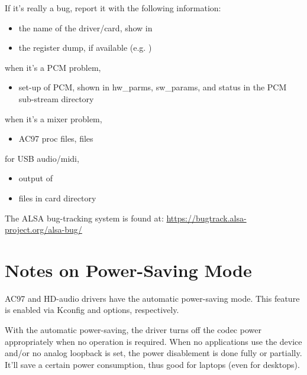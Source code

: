 \documentclass[a4paper,8pt,english]{sphinxmanual}
\begin{document}
If it's really a bug, report it with the following information:
\begin{itemize}
\item {} 
the name of the driver/card, show in 

\item {} 
the register dump, if available (e.g. )

\end{itemize}

when it's a PCM problem,
\begin{itemize}
\item {} 
set-up of PCM, shown in hw\_parms, sw\_params, and status in the PCM
sub-stream directory

\end{itemize}

when it's a mixer problem,
\begin{itemize}
\item {} 
AC97 proc files,  files

\end{itemize}

for USB audio/midi,
\begin{itemize}
\item {} 
output of 

\item {} 
 files in card directory

\end{itemize}

The ALSA bug-tracking system is found at:
\href{https://bugtrack.alsa-project.org/alsa-bug/}{https://bugtrack.alsa-project.org/alsa-bug/}


\section{Notes on Power-Saving Mode}
\label{sound/designs/powersave:notes-on-power-saving-mode}\label{sound/designs/powersave::doc}
AC97 and HD-audio drivers have the automatic power-saving mode.
This feature is enabled via Kconfig 
and  options, respectively.

With the automatic power-saving, the driver turns off the codec power
appropriately when no operation is required.  When no applications use
the device and/or no analog loopback is set, the power disablement is
done fully or partially.  It'll save a certain power consumption, thus
good for laptops (even for desktops).
\end{document}
